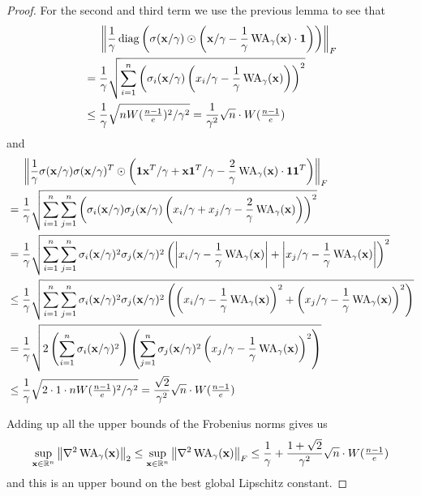 \begin{proof}
 For the second and third term we use the previous lemma to see that
 \begin{align*}
  &\phantom{{}={}} \Norm{ \frac{1}{\gamma} \diag \BktR{ \sigma(\mathbf{x}/\gamma) \odot \BktR{ \mathbf{x}/\gamma - \frac{1}{\gamma} \WA_\gamma(\mathbf{x}) \cdot \mathbf{1} } } }_F \\
  &= \frac{1}{\gamma} \sqrt{ \sum_{i=1}^n \BktR{ \sigma_i(\mathbf{x}/\gamma) \BktR{ x_i/\gamma - \frac{1}{\gamma} \WA_\gamma(\mathbf{x}) } }^2 } \\
  &\leq \frac{1}{\gamma} \sqrt{ n W(\tfrac{n-1}{e})^2 / \gamma^2 } = \frac{1}{\gamma^2} \sqrt{n} \cdot W(\tfrac{n-1}{e})
 \end{align*}
 and
 \begin{align*}
  &\phantom{{}={}} \Norm{ \frac{1}{\gamma} \sigma(\mathbf{x}/\gamma) \sigma(\mathbf{x}/\gamma)^T \odot \BktR{ \mathbf{1} \mathbf{x}^T / \gamma + \mathbf{x} \mathbf{1}^T / \gamma - \frac{2}{\gamma} \WA_\gamma(\mathbf{x}) \cdot \mathbf{1} \mathbf{1}^T } }_F \\
  &= \frac{1}{\gamma} \sqrt{ \sum_{i=1}^n \sum_{j=1}^n \BktR{ \sigma_i(\mathbf{x}/\gamma) \sigma_j(\mathbf{x}/\gamma) \BktR{ x_i/\gamma + x_j/\gamma - \frac{2}{\gamma} \WA_\gamma(\mathbf{x}) } }^2 } \\
  &= \frac{1}{\gamma} \sqrt{ \sum_{i=1}^n \sum_{j=1}^n \sigma_i(\mathbf{x}/\gamma)^2 \sigma_j(\mathbf{x}/\gamma)^2 \BktR{ \Abs{ x_i/\gamma - \frac{1}{\gamma} \WA_\gamma(\mathbf{x})} + \Abs{ x_j/\gamma - \frac{1}{\gamma} \WA_\gamma(\mathbf{x}) } }^2 } \\
  &\leq \frac{1}{\gamma} \sqrt{ \sum_{i=1}^n \sum_{j=1}^n \sigma_i(\mathbf{x}/\gamma)^2 \sigma_j(\mathbf{x}/\gamma)^2 \BktR{ \BktR{ x_i/\gamma - \frac{1}{\gamma} \WA_\gamma(\mathbf{x})}^2 + \BktR{ x_j/\gamma - \frac{1}{\gamma} \WA_\gamma(\mathbf{x}) }^2 } } \\
  &= \frac{1}{\gamma} \sqrt{ 2 \BktR{ \sum_{i=1}^n \sigma_i(\mathbf{x}/\gamma)^2 } \BktR{ \sum_{j=1}^n \sigma_j(\mathbf{x}/\gamma)^2 \BktR{ x_j/\gamma - \frac{1}{\gamma} \WA_\gamma(\mathbf{x})}^2 } } \\
  &\leq \frac{1}{\gamma} \sqrt{ 2 \cdot 1 \cdot n W(\tfrac{n-1}{e})^2 / \gamma^2 } = \frac{\sqrt{2}}{\gamma^2} \sqrt{n} \cdot W(\tfrac{n-1}{e})
 \end{align*}
 
 Adding up all the upper bounds of the Frobenius norms gives us
 \[ \sup_{\mathbf{x} \in \mathbb{R}^n} \left\lVert\nabla^2 \operatorname{WA}_\gamma (\mathbf{x})\right\rVert_2 \leq \sup_{\mathbf{x} \in \mathbb{R}^n} \left\lVert\nabla^2 \operatorname{WA}_\gamma (\mathbf{x})\right\rVert_F \leq \frac{1}{\gamma} + \frac{1+\sqrt{2}}{\gamma^2} \sqrt{n} \cdot W(\tfrac{n-1}{e}) \]
 and this is an upper bound on the best global Lipschitz constant.
\end{proof}
